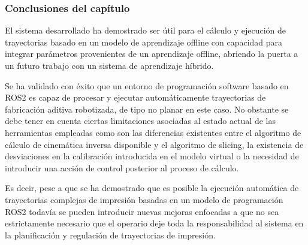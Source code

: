 \subsubsection*{Conclusiones del capítulo}
\hypertarget{Conclusiones del capítulo}{}
\label{sec: conclusiones capítulo trayectorias} 

El sistema desarrollado ha demostrado ser útil para el cálculo y ejecución de trayectorias basado en un modelo de aprendizaje offline con capacidad para integrar parámetros provenientes de un aprendizaje offline, abriendo la puerta a un futuro trabajo con un sistema de aprendizaje híbrido.

Se ha validado con éxito que un entorno de programación software basado en ROS2 es capaz de procesar y ejecutar automáticamente trayectorias de fabricación aditiva robotizada, de tipo no planar en este caso. No obstante se debe tener en cuenta ciertas limitaciones asociadas al estado actual de las herramientas empleadas como son las diferencias existentes entre el algoritmo de cálculo de cinemática inversa disponible y el algoritmo de slicing, la existencia de desviaciones en la calibración introducida en el modelo virtual o la necesidad de introducir una acción de control posterior al proceso de cálculo.

Es decir, pese a que se ha demostrado que es posible la ejecución automática de trayectorias complejas de impresión basadas en un modelo de programación ROS2 todavía se pueden introducir nuevas mejoras enfocadas a que no sea estrictamente necesario que el operario deje toda la responsabilidad al sistema en la planificación y regulación de trayectorias de impresión.